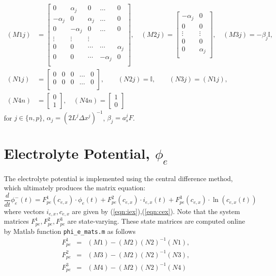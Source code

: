 \documentclass[12pt]{article}
\newcommand{\Id}{{\mathbb{I}}}
\begin{document}
\begin{align}
(M1j) &=
\left[
\begin{array}{ccccc}
 0 & \alpha_{j} & 0 & \ldots & 0  \\
 -\alpha_{j} & 0 & \alpha_{j} & \ldots & 0  \\
 0 & -\alpha_{j} & 0 & \ldots & 0  \\
 \vdots & \vdots & \vdots &  &  \\
 0 & 0 & \cdots & \cdots & \alpha_{j} \\
 0 & 0 & \cdots & -\alpha_{j} & 0 \\
\end{array}
\right], \quad
(M2j) =
\left[
\begin{array}{cc}
 -\alpha_{j} & 0  \\
 0 & 0 \\
 \vdots & \vdots  \\
 0 & 0 \\
 0 & \alpha_{j} \\
\end{array}
\right], \quad
(M3j) = -\beta_{j} \Id, \\
(N1j) &=
\left[
\begin{array}{ccccc}
 0 & 0 & 0 & \ldots & 0  \\
 0 & 0 & 0 & \ldots & 0  \\
\end{array}
\right], \qquad
(N2j) = \Id, \qquad
(N3j) = (N1j), \quad \\
(N4n) &= 
\left[
\begin{array}{c}
  0 \\
  1
\end{array}
\right], \quad
(N4n) = 
\left[
\begin{array}{c}
  1 \\
  0
\end{array}
\right]
\end{align}
for $j \in \{n,p\}$, $\alpha_{j} = (2 L^{j} \Delta x^{j})^{-1}$, $\beta_{j} = a_{s}^{j} F$.

\section{Electrolyte Potential, $\phi_{e}$}\label{sec:phie}
The electrolyte potential is implemented using the central difference method, which ultimately produces the matrix equation:
\begin{equation}
	\frac{d}{dt} \phi_{e}^{-}(t) = F^{1}_{pe}(c_{e,x}) \cdot \phi_{e}(t) + F^{2}_{pe}(c_{e,x}) \cdot i_{e,x}(t) + F^{3}_{pe}(c_{e,x}) \cdot \ln(c_{e,x}(t)) 
\end{equation}
where vectors $i_{e,x}, c_{e,x}$ are given by (\ref{eqn:iex}),(\ref{eqn:cex}). Note that the system matrices $F^{1}_{pe}, F^{2}_{pe}, F^{3}_{pe}$ are state-varying.  These state matrices are computed online by Matlab function \texttt{phi\_e\_mats.m} as follows
\begin{eqnarray}
	F^{1}_{pe} &=& (M1) - (M2)(N2)^{-1}(N1), \\
	F^{2}_{pe} &=& (M3) - (M2)(N2)^{-1}(N3), \\
	F^{3}_{pe} &=& (M4) - (M2)(N2)^{-1}(N4)
\end{eqnarray}
\end{document}

